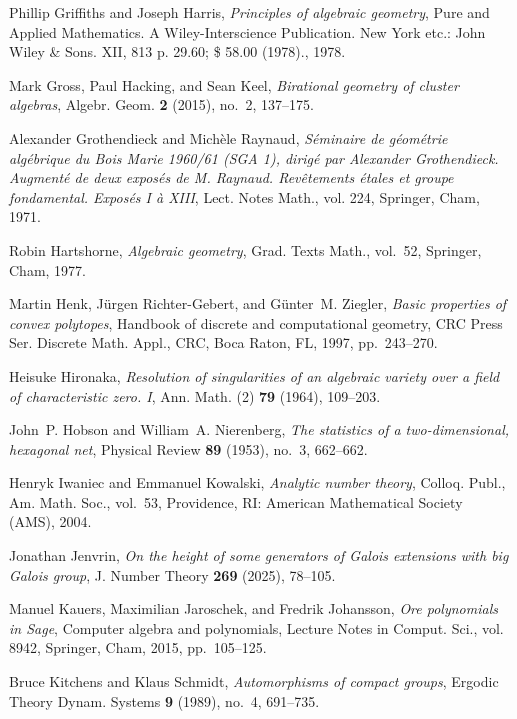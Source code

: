 \documentclass[12pt,reqno]{amsart}
\theoremstyle{definition}
\theoremstyle{plain}
\theoremstyle{definition}
\begin{document}
\begin{thebibliography}{100}
Phillip Griffiths and Joseph Harris, \emph{Principles of algebraic geometry},
  Pure and {Applied} {Mathematics}. {A} {Wiley}-{Interscience} {Publication}.
  {New} {York} etc.: {John} {Wiley} \& {Sons}. {XII}, 813 p. {{\textsterling}}
  29.60; \$ 58.00 (1978)., 1978.

Mark Gross, Paul Hacking, and Sean Keel, \emph{Birational geometry of cluster
  algebras}, Algebr. Geom. \textbf{2} (2015), no.~2, 137--175.

Alexander Grothendieck and Mich{\`e}le Raynaud, \emph{S{\'e}minaire de
  g{\'e}om{\'e}trie alg{\'e}brique du {Bois} {Marie} 1960/61 ({SGA} 1),
  dirig{\'e} par {Alexander} {Grothendieck}. {Augment{\'e}} de deux expos{\'e}s
  de {M}. {Raynaud}. {Rev{\^e}tements} {\'e}tales et groupe fondamental.
  {Expos{\'e}s} {I} {\`a} {XIII}}, Lect. Notes Math., vol. 224, Springer, Cham,
  1971.

Robin Hartshorne, \emph{Algebraic geometry}, Grad. Texts Math., vol.~52,
  Springer, Cham, 1977.

Martin Henk, J\"urgen Richter-Gebert, and G\"unter~M. Ziegler, \emph{Basic
  properties of convex polytopes}, Handbook of discrete and computational
  geometry, CRC Press Ser. Discrete Math. Appl., CRC, Boca Raton, FL, 1997,
  pp.~243--270.

Heisuke Hironaka, \emph{Resolution of singularities of an algebraic variety
  over a field of characteristic zero. {I}}, Ann. Math. (2) \textbf{79} (1964),
  109--203.

John~P. {Hobson} and William~A. {Nierenberg}, \emph{The statistics of a
  two-dimensional, hexagonal net}, Physical Review \textbf{89} (1953), no.~3,
  662--662.

Henryk Iwaniec and Emmanuel Kowalski, \emph{Analytic number theory}, Colloq.
  Publ., Am. Math. Soc., vol.~53, Providence, RI: American Mathematical Society
  (AMS), 2004.

Jonathan Jenvrin, \emph{On the height of some generators of {G}alois extensions
  with big {G}alois group}, J. Number Theory \textbf{269} (2025), 78--105.

Manuel Kauers, Maximilian Jaroschek, and Fredrik Johansson, \emph{Ore
  polynomials in {S}age}, Computer algebra and polynomials, Lecture Notes in
  Comput. Sci., vol. 8942, Springer, Cham, 2015, pp.~105--125.

Bruce Kitchens and Klaus Schmidt, \emph{Automorphisms of compact groups},
  Ergodic Theory Dynam. Systems \textbf{9} (1989), no.~4, 691--735.


\end{thebibliography}
\end{document}
